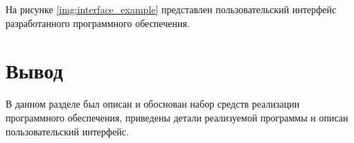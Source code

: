 На рисунке \ref{img:interface_example} представлен пользовательский интерфейс разработанного программного обеспечения.


\section*{Вывод}

В данном разделе был описан и обоснован набор средств реализации программного обеспечения, приведены детали реализуемой программы и описан пользовательский интерфейс.